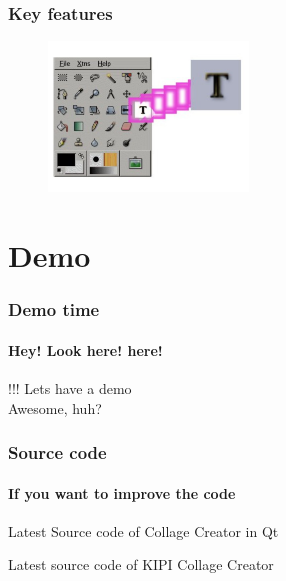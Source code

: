 \documentclass[12pt]{beamer}
\begin{document}
\begin{frame}
\frametitle{Key features}
\begin{figure}
   \includegraphics[height= 4cm]{images/text.jpg}
\end{figure}
\end{frame}

\section{Demo}
\begin{frame}
  \frametitle{Demo time}
  \framesubtitle{Hey! Look here! here!}
  \begin{alertblock}{!!!}
  \alert{Lets have a demo}\\ \pause
  Awesome, huh?
  \end{alertblock}
\end{frame}

\newcommand{\putlink}[1]{%
   \pgfsetlinewidth{1.4pt}%
   \pgfsetendarrow{\pgfarrowtriangle{4pt}}%
   \pgfline{\pgfxy(1,1)}{\pgfxy(#1,1)}
}

\begin{frame}
  \frametitle{Source code}
  \framesubtitle{If you want to improve the code}
  \begin{thebibliography}{10}

  \beamertemplatearticlebibitems

    Latest Source code of Collage Creator in Qt
	
    Latest source code of KIPI Collage Creator

  \end{thebibliography}
\end{frame}

\end{document}

